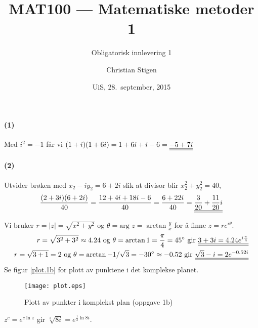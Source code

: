 \documentclass[a4paper,norsk,12pt]{article}
\title{MAT100 --- Matematiske metoder 1}
\subtitle{Obligatorisk innlevering 1}
\author{Christian Stigen}
\date{UiS, 28.~september, 2015}
\begin{document}
\maketitle


\paragraph{(1)}
Med $i^2 = -1$ får vi
\begin{math}
  (1+i)(1+6i) = 1+6i+i-6 = {\underline{\underline{-5+7i}}}
\end{math}

\paragraph{(2)}
Utvider brøken med $x_2 - iy_2 = 6 + 2i$ slik at divisor blir $x_2^2 +
y_2^2 = 40$,
\begin{equation*}
  \frac{(2+3i)(6+2i)}{40} = \frac{12+4i+18i-6}{40}
  = \frac{6+22i}{40} = {\underline{\underline{\frac{3}{20} + \frac{11}{20}i}}}
\end{equation*}


Vi bruker $r = |z| = \sqrt{x^2+y^2}$ og $\theta = \text{arg } z =
\arctan\frac{y}{x}$ for å finne $z = re^{i\theta}$.
\begin{equation*}
\begin{split}
  r = \sqrt{3^2+3^2} \approx 4.24 \text{ og } \theta = \arctan{1} =
  \frac{\pi}{4} = 45^\circ \text{ gir } {\underline{\underline{3+3i = 4.24 e^{i\frac{\pi}{4}}}}}
  \\
  r=\sqrt{3+1}=2 \text{ og } \theta = \arctan{-1/\sqrt{3}} = -30^\circ \approx -0.52
  \text{ gir }
  {\underline{\underline{\sqrt{3}-i = 2e^{-0.52i}}}}
\end{split}
\end{equation*}
Se figur \vref{plot.1b} for plott av punktene i det komplekse planet.
%
\begin{figure}
\centering
\texttt{[image: plot.eps]}
\caption{Plott av punkter i komplekst plan (oppgave 1b)}
\label{plot.1b}
\end{figure}

$z^c = e^{c\ln{z}}$ gir $\sqrt[3]{8i} = e^{\frac{1}{3}\ln{8i}}$.
\begin{equation*}
\begin{split}
\end{split}
\end{equation*}

\end{document}
